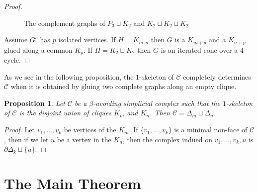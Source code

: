 \documentclass[letterpaper,12pt]{amsart}
\theoremstyle{plain}
\newtheorem{prop}[thm]{Proposition}
\theoremstyle{definition}
\theoremstyle{remark}
\newcommand{\calc}{\mathcal{C}}
\newcommand{\vertex}{\node[vertex]}
\begin{document}
\begin{proof}
\begin{figure}
\begin{tikzpicture}
		\end{tikzpicture}
		\hspace{50pt}
		\caption{The complement graphs of $P_3 \sqcup K_2$ and $K_2 \sqcup K_2 \sqcup K_2$}\label{fig:complements}
	\end{figure}
	Assume $G^c$ has $p$ isolated vertices.
	If $H = K_{m,n}$ then $G$ is a $K_{m+p}$ and a $K_{n+p}$ glued along a common $K_p$.
	If $H= K_2 \sqcup K_2$ then $G$ is an iterated cone over a $4$-cycle.
\end{proof}

As we see in the following proposition, the $1$-skeleton of $\calc$ completely determines $\calc$ when it is
obtained by gluing two complete graphs along an empty clique.

\begin{prop}\label{disconnected}
	Let $\mathcal{C}$ be a $\beta$-avoiding simplicial complex such that the $1$-skeleton
	of $\mathcal{C}$ is the disjoint union of cliques $K_m$ and $K_n$.
	Then $\mathcal{C} = \Delta_m \sqcup \Delta_n$.
\end{prop}
\begin{proof}
	Let $v_1,\dots,v_k$ be vertices of the $K_m$.
	If $\{v_1,\dots,v_k\}$ is a minimal non-face of $\mathcal{C}$, then if we let $u$
	be a vertex in the $K_n$, then the complex indued on $v_1,\dots,v_k,u$ is $\partial\Delta_k \sqcup \{u\}$.
\end{proof}









\section{The Main Theorem}\label{sec:main}
\end{document}
